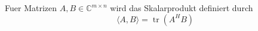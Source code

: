 Fuer Matrizen $A, B \in \mathbb{C}^{m \times n}$ wird das Skalarprodukt definiert durch
$$\langle A, B \rangle = \operatorname{tr}(A^H B)$$ 
